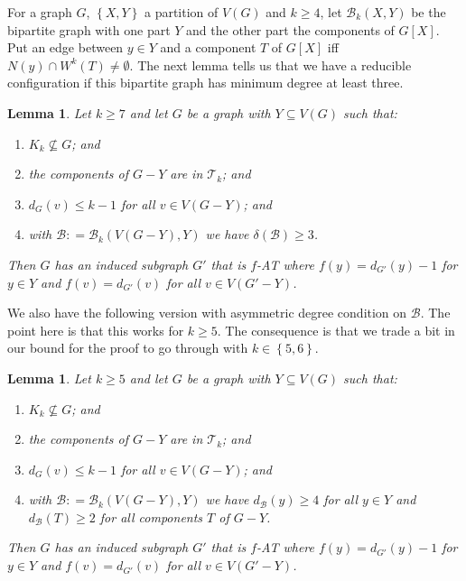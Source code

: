 \documentclass[10pt]{article}
\renewcommand{\leq}{\leqslant}
\renewcommand{\ge}{\geqslant}
\theoremstyle{plain}
\newtheorem{lem}[thm]{Lemma}
\theoremstyle{definition}
\theoremstyle{remark}
\newcommand{\fancy}[1]{\mathcal{#1}}
\newcommand{\T}{\fancy{T}}
\newcommand{\B}{\fancy{B}}
\newcommand{\set}[1]{\left\{ #1 \right\}}
\newcommand{\DefinedAs}{\mathrel{\mathop:}=}
\begin{document}
For a graph $G$, $\set{X, Y}$ a partition of $V(G)$ and $k \ge 4$, let $\B_k(X, Y)$ be the bipartite graph with one part $Y$ and the other part the components of $G[X]$.  Put an edge between $y \in Y$ and a component $T$ of $G[X]$ iff $N(y) \cap W^k(T) \ne \emptyset$.   The next lemma tells us that we have a reducible configuration if this bipartite graph has minimum degree at least three.  

\begin{lem}
	\label{MultipleHighConfigurationEuler} Let $k\ge7$ and let $G$ be a graph with
	$Y\subseteq V(G)$ such that: 
	\begin{enumerate}
		\item $K_{k}\not\subseteq G$; and 
		\item the components of $G-Y$ are in $\T_{k}$; and 
		\item $d_{G}(v)\leq k-1$ for all $v\in V(G-Y)$; and 
		\item with $\B\DefinedAs\B_{k}(V(G-Y),Y)$ we have $\delta(\B)\ge3$. 
	\end{enumerate}
	\noindent Then $G$ has an induced subgraph $G'$ that is $f$-AT where $f(y)=d_{G'}(y)-1$
	for $y\in Y$ and $f(v)=d_{G'}(v)$ for all $v\in V(G'-Y)$.\end{lem}

We also have the following version with asymmetric degree condition on $\B$.  
The point here is that this works for $k \ge 5$.  
The consequence is that we trade a bit in our bound for the proof to go through with $k \in \set{5,6}$.

\begin{lem}
	\label{MultipleHighConfigurationEulerLopsided} Let $k \ge 5$ and let $G$ be a graph with
	$Y\subseteq V(G)$ such that: 
	\begin{enumerate}
		\item $K_{k}\not\subseteq G$; and 
		\item the components of $G-Y$ are in $\T_{k}$; and 
		\item $d_{G}(v)\leq k-1$ for all $v\in V(G-Y)$; and 
		\item with $\B \DefinedAs \B_k(V(G-Y), Y)$ we have $d_{\B}(y) \ge 4$ for all $y \in Y$ and $d_{\B}(T) \ge 2$ for all components $T$ of $G-Y$.
	\end{enumerate}
	\noindent Then $G$ has an induced subgraph $G'$ that is $f$-AT where $f(y)=d_{G'}(y)-1$
	for $y\in Y$ and $f(v)=d_{G'}(v)$ for all $v\in V(G'-Y)$.
\end{lem}
\end{document}
